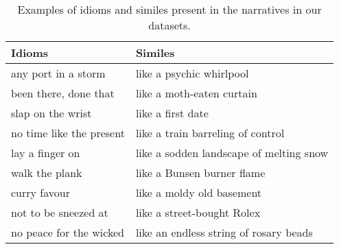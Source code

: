\begin{table}[t]
\setlength{\tabcolsep}{2pt}
\scriptsize
\centering
\begin{tabular}{ll}
\toprule
\textbf{Idioms} & \textbf{Similes} \\ \midrule
any port in a storm & like a psychic whirlpool\\ 
been there, done that & like a moth-eaten curtain\\  
slap on the wrist & like a first date\\ 
no time like the present & like a train barreling of control\\ 
lay a finger on & like a sodden landscape of melting snow\\  
walk the plank & like a Bunsen burner flame\\  
curry favour & like a moldy old basement\\ 
not to be sneezed at & like a street-bought Rolex\\ 
no peace for the wicked & like an endless string of rosary beads\\

\bottomrule
\end{tabular}
\caption{Examples of idioms and similes present in the narratives in our datasets.}
\label{tab:example_expressions}
\end{table}